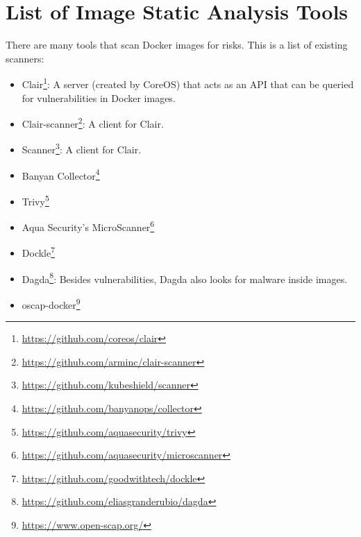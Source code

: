 \chapter{List of Image Static Analysis Tools}\label{appendix:static-analysis-list}
There are many tools that scan Docker images for risks. This is a list of existing scanners:
\begin{itemize}
    \item Clair\footnote{\url{https://github.com/coreos/clair}}: A server (created by CoreOS) that acts as an API that can be queried for vulnerabilities in Docker images.
    \item Clair-scanner\footnote{\url{https://github.com/arminc/clair-scanner}}: A client for Clair.
    \item Scanner\footnote{\url{https://github.com/kubeshield/scanner}}: A client for Clair.
    \item Banyan Collector\footnote{\url{https://github.com/banyanops/collector}}
    \item Trivy\footnote{\url{https://github.com/aquasecurity/trivy}}
    \item Aqua Security's MicroScanner\footnote{\url{https://github.com/aquasecurity/microscanner}}
    \item Dockle\footnote{\url{https://github.com/goodwithtech/dockle}}
    \item Dagda\footnote{\url{https://github.com/eliasgranderubio/dagda}}: Besides vulnerabilities, Dagda also looks for malware inside images.
    \item oscap-docker\footnote{\url{https://www.open-scap.org/}}
\end{itemize}
